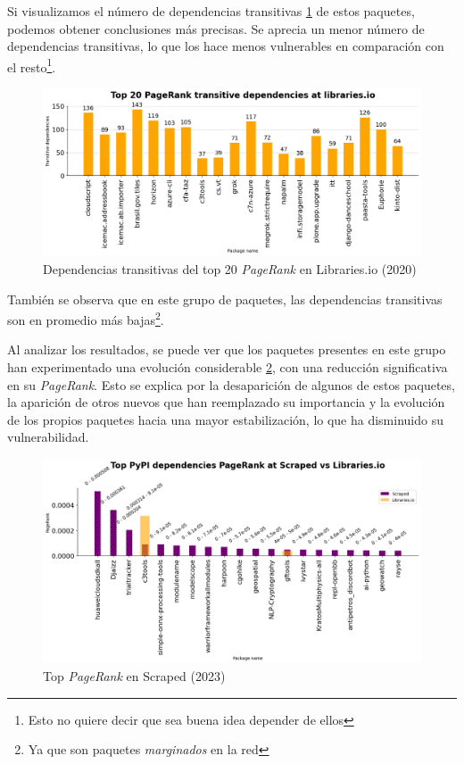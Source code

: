Si visualizamos el número de dependencias transitivas \ref{fig:Dependencias transitivas del top 20 pagerank en Libraries.io}
de estos paquetes, podemos obtener conclusiones más precisas.
Se aprecia un menor número de dependencias transitivas, lo que los hace menos vulnerables en
comparación con el resto\footnote{Esto no quiere decir que sea buena idea depender de ellos}.

\begin{figure}[ht!]
    \begin{center}
        \includegraphics[width=1\textwidth]{img/pypi/transitive libraries.png}
        \caption{Dependencias transitivas del top 20 \textit{PageRank} en Libraries.io (2020)}
        \label{fig:Dependencias transitivas del top 20 pagerank en Libraries.io}
    \end{center}
\end{figure}

También se observa que en este grupo de paquetes, las dependencias transitivas son en promedio
más bajas\footnote{Ya que son paquetes \textit{marginados} en la red}.

Al analizar los resultados, se puede ver que los paquetes presentes en este grupo han
experimentado una evolución considerable \ref{fig:Top PageRank en Scraped}, con una reducción significativa en
su \textit{PageRank}. Esto se explica por la desaparición de algunos
de estos paquetes, la aparición de otros nuevos que han reemplazado su importancia y
la evolución de los propios paquetes hacia una mayor estabilización, lo que ha disminuido
su vulnerabilidad.

\begin{figure}[ht!]
    \begin{center}
        \includegraphics[width=1\textwidth]{img/pypi/t20_dep_pr_scraped.png}
        \caption{Top \textit{PageRank} en Scraped (2023)}
        \label{fig:Top PageRank en Scraped}
    \end{center}
\end{figure}

